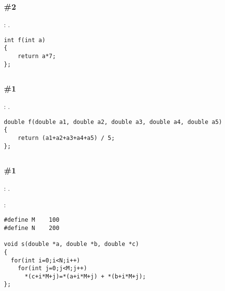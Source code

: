 \subsubsection{\Exercise \#2}
\label{exercise_solutions_arith_optimizations_2}

\Exercise: .

\begin{lstlisting}
int f(int a)
{
	return a*7;
};
\end{lstlisting}

\subsection{}

\subsubsection{\Exercise \#1}
\label{exercise_solutions_FPU_2}

\Exercise: .


\begin{lstlisting}
double f(double a1, double a2, double a3, double a4, double a5)
{
	return (a1+a2+a3+a4+a5) / 5;
};
\end{lstlisting}

\subsection{}

\subsubsection{\Exercise \#1}
\label{exercise_solutions_arrays_1}

\Exercise: .


:

\begin{lstlisting}
#define M    100
#define N    200

void s(double *a, double *b, double *c)
{
  for(int i=0;i<N;i++)
    for(int j=0;j<M;j++)
      *(c+i*M+j)=*(a+i*M+j) + *(b+i*M+j);
};
\end{lstlisting}

